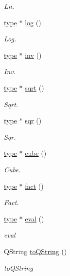 \begin{DoxyCompactItemize}
\begin{DoxyCompactList}\small\item\em Ln. \end{DoxyCompactList}\item 
\hyperlink{classtype}{type} $\ast$ \hyperlink{class_expression_ad7931ef818f158346f5b979569a1a7d0}{log} ()
\begin{DoxyCompactList}\small\item\em Log. \end{DoxyCompactList}\item 
\hyperlink{classtype}{type} $\ast$ \hyperlink{class_expression_aca3f23b76ddc13f197127c231830d1a1}{inv} ()
\begin{DoxyCompactList}\small\item\em Inv. \end{DoxyCompactList}\item 
\hyperlink{classtype}{type} $\ast$ \hyperlink{class_expression_adf9f4b7e58d0f1a3a584c4493302c0b4}{sqrt} ()
\begin{DoxyCompactList}\small\item\em Sqrt. \end{DoxyCompactList}\item 
\hyperlink{classtype}{type} $\ast$ \hyperlink{class_expression_ac0520d2c2b2527a430701b964b6ef5f8}{sqr} ()
\begin{DoxyCompactList}\small\item\em Sqr. \end{DoxyCompactList}\item 
\hyperlink{classtype}{type} $\ast$ \hyperlink{class_expression_a2f75b5877cd84204a180dc510035b6d5}{cube} ()
\begin{DoxyCompactList}\small\item\em Cube. \end{DoxyCompactList}\item 
\hyperlink{classtype}{type} $\ast$ \hyperlink{class_expression_aeebb8e11701e8e618236ff66abcb378f}{fact} ()
\begin{DoxyCompactList}\small\item\em Fact. \end{DoxyCompactList}\item 
\hyperlink{classtype}{type} $\ast$ \hyperlink{class_expression_a4cbf84a0a4fcfcb54439c4ae5cc359ec}{eval} ()
\begin{DoxyCompactList}\small\item\em eval \end{DoxyCompactList}\item 
Q\-String \hyperlink{class_expression_a4404792ff4997e7c06a3242062825f5c}{to\-Q\-String} ()
\begin{DoxyCompactList}\small\item\em to\-Q\-String \end{DoxyCompactList}\end{DoxyCompactItemize}
